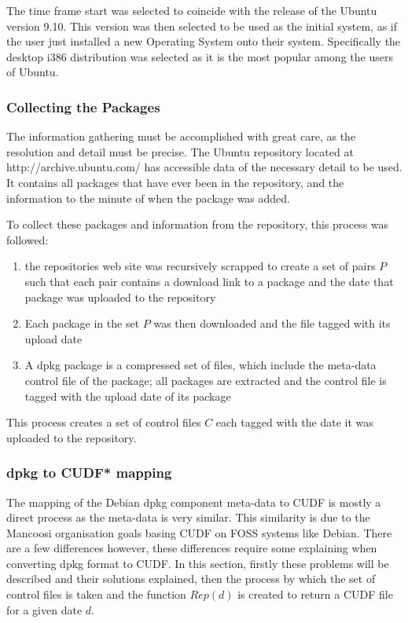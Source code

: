 

The time frame start was selected to coincide with the release of the Ubuntu version 9.10.
This version was then selected to be used as the initial system, as if the user just installed a new Operating System onto their system.
Specifically the desktop i386 distribution was selected as it is the most popular among the users of Ubuntu.


\subsubsection{Collecting the Packages}
The information gathering must be accomplished with great care, as the resolution and detail must be precise.
The Ubuntu repository located at http://archive.ubuntu.com/ has accessible data of the necessary detail to be used.
It contains all packages that have ever been in the repository, and the information to the minute of when the package was added.

To collect these packages and information from the repository, this process was followed:
\begin{enumerate}
  \item the repositories web site was recursively scrapped to create a set of pairs $P$ 
  such that each pair contains a download link to a package and the date that package was uploaded to the repository
  \item Each package in the set $P$ was then downloaded and the file tagged with its upload date
  \item A dpkg package is a compressed set of files, 
  which include the meta-data control file of the package; all packages are extracted and the control file is tagged with the upload date of its package 
\end{enumerate}

This process creates a set of control files $C$ each tagged with the date it was uploaded to the repository.

\subsubsection{dpkg to CUDF* mapping}
\label{ubuntusimulation.debtocudf}
The mapping of the Debian dpkg component meta-data to CUDF is mostly a direct process as the meta-data is very similar.
This similarity is due to the Mancoosi organisation goals basing CUDF on FOSS systems like Debian.  
There are a few differences however, these differences require some explaining when converting dpkg format to CUDF.
In this section, firstly these problems will be described and their solutions explained, 
then the process by which the set of control files is taken and the function $Rep(d)$ is created to return a CUDF file for a given date $d$.


